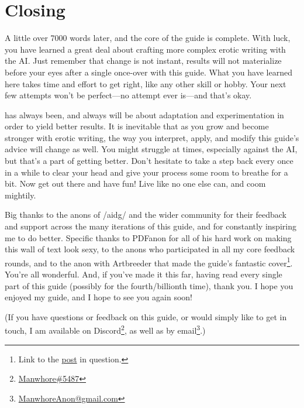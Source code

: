 ﻿\documentclass[Coomer-main.tex]{subfiles}
\begin{document}
\begin{enumerate}
\end{enumerate}

\chapter{Closing}

A little over 7000 words later, and the core of the guide is complete.
With luck, you have learned a great deal about crafting more complex erotic writing with the AI.
Just remember that change is not instant, results will not materialize before your eyes after a single once-over with this guide.
What you have learned here takes time and effort to get right, like any other skill or hobby.
Your next few attempts won't be perfect—no attempt ever is—and that's okay.

\aid has always been, and always will be about adaptation and experimentation in order to yield better results.
It is inevitable that as you grow and become stronger with erotic writing, the way you interpret, apply, and modify this guide's advice will change as well.
You might struggle at times, especially against the AI, but that's a part of getting better.
Don't hesitate to take a step back every once in a while to clear your head and give your process some room to breathe for a bit.
Now get out there and have fun!
Live like no one else can, and coom mightily.

Big thanks to the anons of /aidg/ and the wider \aid community for their feedback and support across the many iterations of this guide, and for constantly inspiring me to do better.
Specific thanks to PDFanon for all of his hard work on making this wall of text look sexy, to the anons who participated in all my core feedback rounds, and to the anon with Artbreeder that made the guide’s fantastic cover\footnote{Link to the \href{https://arch.b4k.co/vg/thread/313360917/\#q313434592}{post} in question.}.
You're all wonderful.
And, if you've made it this far, having read every single part of this guide (possibly for the fourth/billionth time), thank you.
I hope you enjoyed my guide, and I hope to see you again soon!
\bigskip

(If you have questions or feedback on this guide, or would simply like to get in touch, I am available on Discord\footnote{\href{https://discordapp.com/users/773014944718389248}{Manwhore\#5487}}, as well as by email\footnote{\href{mailto:ManwhoreAnon@gmail.com}{ManwhoreAnon@gmail.com}}.)
\end{document}
